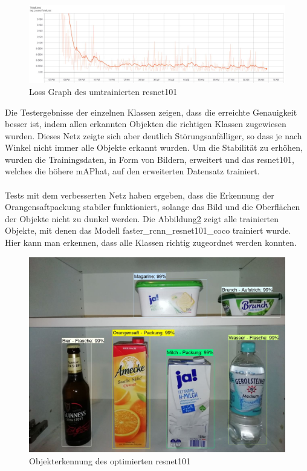 \documentclass[a4paper,12pt,oneside]{article}
\begin{document}
\begin{figure}
    [h]
	\centering
	\includegraphics[scale=0.4]{Sources/loss_graph_resnet101.jpg}
	\vspace{0.5 cm}
	\caption{Loss Graph des umtrainierten resnet101}
	\label{img:loss_graph_resnet101}
\end{figure}

Die Testergebnisse der einzelnen Klassen zeigen, dass die erreichte Genauigkeit besser ist, indem allen erkannten Objekten die richtigen Klassen zugewiesen wurden. Dieses Netz zeigte sich aber deutlich Störungsanfälliger, so dass je nach Winkel nicht immer alle Objekte erkannt wurden. Um die Stabilität zu erhöhen, wurden die Trainingsdaten, in Form von Bildern, erweitert und das resnet101, welches die höhere \glqq mAP\grqq hat, auf den erweiterten Datensatz trainiert.\\
\\
Tests mit dem verbesserten Netz haben ergeben, dass die Erkennung der Orangensaftpackung stabiler funktioniert, solange das Bild und die Oberflächen der Objekte nicht zu dunkel werden. Die Abbildung\ref{img:resnet101_test} zeigt alle trainierten Objekte, mit denen das Modell faster\_rcnn\_resnet101\_coco trainiert wurde. Hier kann man erkennen, dass alle Klassen richtig zugeordnet werden konnten.

\begin{figure}
    [h]
	\centering
	\includegraphics[scale=0.5]{Sources/final_detection.jpg}
	\vspace{0.3 cm}
	\caption{Objekterkennung des optimierten resnet101}
	\label{img:resnet101_test}
\end{figure}
\end{document}
